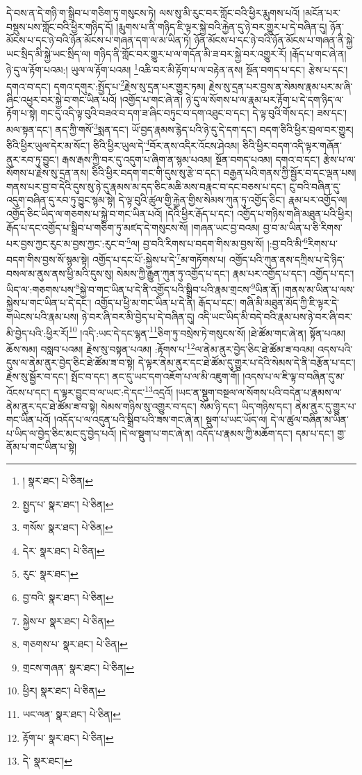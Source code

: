 དེ་བས་ན་དེ་གཉི་ག་སྒྲིབ་པ་གཅིག་ཏུ་གསུངས་ཏེ། ལས་སུ་མི་རུང་བར་གློང་བའི་ཕྱིར་རྨུགས་པའོ། །མངོན་པར་བསྡུས་པས་གློང་བའི་ཕྱིར་གཉིད་དོ། །རྨུགས་པ་ནི་གཉིད་ཇི་ལྟར་སྐྱེ་བའི་རྐྱེན་དུ་ཉེ་བར་གྱུར་པ་དེ་བཞིན་དུ། ཉོན་མོངས་པ་དང་ཉེ་བའི་ཉོན་མོངས་པ་གཞན་དག་ལ་མ་ཡིན་ཏེ། ཉོན་མོངས་པ་དང་ཉེ་བའི་ཉོན་མོངས་པ་གཞན་ནི་སྐྱེ་ཡང་སྲིད་མི་སྐྱེ་ཡང་སྲིད་ལ། གཉིད་ནི་གློང་བར་གྱུར་པ་ལ་གདོན་མི་ཟ་བར་སྐྱེ་བར་འགྱུར་རོ། །རྒོད་པ་གང་ཞེ་ན། ཉེ་དུ་ལ་རྟོག་པའམ:། ཡུལ་ལ་རྟོག་པའམ། \footnote{།    སྣར་ཐང་།  པེ་ཅིན། }འཆི་བར་མི་རྟོག་པ་ལ་བརྟེན་ནས། སྔོན་བགད་པ་དང་། རྩེས་པ་དང་། དགའ་བ་དང་། དགའ་དགུར་:སྤྱོད་པ་\footnote{སྤྱད་པ་  སྣར་ཐང་།  པེ་ཅིན། }རྗེས་སུ་དྲན་པར་གྱུར་ཏམ། རྗེས་སུ་དྲན་པར་བྱས་ན་སེམས་རྣམ་པར་མ་ཞི་ཞིང་འཕྱར་བར་སྐྱེ་བ་གང་ཡིན་པའོ། །འགྱོད་པ་གང་ཞེ་ན། ཉེ་དུ་ལ་སོགས་པ་ལ་རྣམ་པར་རྟོག་པ་དེ་དག་ཉིད་ལ་རྟོག་པ་སྟེ། གང་དུ་འདི་ལྟ་བུའི་བཟའ་བ་དག་ཟ་ཞིང་བཏུང་བ་དག་འཐུང་བ་དང་། དེ་ལྟ་བུའི་གོས་དང་། ཟས་དང་། མལ་སྟན་དང་། ནད་ཀྱི་གསོ་\footnote{གསོས་  སྣར་ཐང་།  པེ་ཅིན། }སྨན་དང་། ཡོ་བྱད་རྣམས་རྙེད་པའི་ཉེ་དུ་དེ་དག་དང་། བདག་ཅིའི་ཕྱིར་བྲལ་བར་གྱུར། ཅིའི་ཕྱིར་ཡུལ་དེར་མ་སོང་། ཅིའི་ཕྱིར་ཡུལ་དེ་\footnote{དེར་  སྣར་ཐང་།  པེ་ཅིན། }བོར་ནས་འདིར་འོངས་ཤེའམ། ཅིའི་ཕྱིར་བདག་འདི་ལྟར་གཞོན་ནུར་རབ་ཏུ་བྱུང་། རྒས་རྒས་ཀྱི་བར་དུ་འདུག་པ་ཞིག་ན་སྙམ་པའམ། སྔོན་བགད་པའམ། དགའ་བ་དང་། རྩེས་པ་ལ་སོགས་པ་རྗེས་སུ་དྲན་ནས། ཅིའི་ཕྱིར་བདག་གང་གི་དུས་སུ་རྩེ་བ་དང་། བརྒྱན་པའི་གནས་ཀྱི་སྦྱོར་བ་དང་ལྡན་པས། གནས་པར་བྱ་བ་དེའི་དུས་སུ་ཉེ་དུ་རྣམས་མ་དད་ཅིང་མཆི་མས་བརྣང་བ་དང་བཅས་པ་དང་། ངུ་བའི་བཞིན་དུ་འདུག་བཞིན་དུ་རབ་ཏུ་བྱུང་སྙམ་སྟེ། དེ་ལྟ་བུའི་ཚུལ་གྱི་རྐྱེན་གྱིས་སེམས་ཀུན་ཏུ་འགྱོད་ཅིང་། རྣམ་པར་འགྱོད་ལ། འགྱོད་ཅིང་ཡིད་ལ་གཅགས་པ་སྐྱེ་བ་གང་ཡིན་པའོ། །དེའི་ཕྱིར་རྒོད་པ་དང་། འགྱོད་པ་གཉིས་གཞི་མཐུན་པའི་ཕྱིར། རྒོད་པ་དང་འགྱོད་པ་སྒྲིབ་པ་གཅིག་ཏུ་མཛད་དེ་གསུངས་སོ། །གཞན་ཡང་བྱ་བའམ། བྱ་བ་མ་ཡིན་པ་ཅི་རིགས་པར་བྱས་ཀྱང་རུང་མ་བྱས་ཀྱང་:རུང་བ་\footnote{རུང་  སྣར་ཐང་། }ལ། བྱ་བའི་རིགས་པ་བདག་གིས་མ་བྱས་སོ། །:བྱ་བའི་མི་\footnote{བྱ་བའི་  སྣར་ཐང་།  པེ་ཅིན། }རིགས་པ་བདག་གིས་བྱས་སོ་སྙམ་སྟེ། འགྱོད་པ་དང་པོ་:སྐྱེས་པ་དེ་\footnote{སྐྱེས་པ་  སྣར་ཐང་།  པེ་ཅིན། }མ་གཏོགས་པ། འགྱོད་པའི་ཀུན་ནས་དཀྲིས་པ་དེ་ཉིད་བསལ་མ་ནུས་ནས་ཕྱི་མའི་དུས་སུ། སེམས་ཀྱི་རྒྱུན་ཀུན་ཏུ་འགྱོད་པ་དང་། རྣམ་པར་འགྱོད་པ་དང་། འགྱོད་པ་དང་། ཡིད་ལ་:གཅགས་པས་\footnote{གཅགས་པ་  སྣར་ཐང་།  པེ་ཅིན། }སྐྱེ་བ་གང་ཡིན་པ་དེ་ནི་འགྱོད་པའི་སྒྲིབ་པའི་རྣམ་གྲངས་\footnote{གྲངས་གཞན་  སྣར་ཐང་།  པེ་ཅིན། }ཡིན་ནོ། །གནས་མ་ཡིན་པ་ལས་སྐྱེས་པ་གང་ཡིན་པ་དེ་དང་། འགྱོད་པ་ཕྱི་མ་གང་ཡིན་པ་དེ་ནི། རྒོད་པ་དང་། གཞི་མི་མཐུན་མོད་ཀྱི་ཇི་ལྟར་དེ་གཡེངས་པའི་རྣམ་པས། ཉེ་བར་ཞི་བར་མི་བྱེད་པ་དེ་བཞིན་དུ། འདི་ཡང་ཡིད་མི་བདེ་བའི་རྣམ་པས་ཉེ་བར་ཞི་བར་མི་བྱེད་པའི་:ཕྱིར་རོ།\footnote{ཕྱིར།  སྣར་ཐང་།  པེ་ཅིན། } །འདི་:ཡང་དེ་དང་ལྷན་\footnote{ཡང་ལན་  སྣར་ཐང་།  པེ་ཅིན། }ཅིག་ཏུ་བསྲེས་ཏེ་གསུངས་སོ། །ཐེ་ཚོམ་གང་ཞེ་ན། སྟོན་པའམ། ཆོས་སམ། བསླབ་པའམ། རྗེས་སུ་བསྟན་པའམ། :རྟོགས་པ་\footnote{རྟོག་པ་  སྣར་ཐང་།  པེ་ཅིན། }ལ་ནེམ་ནུར་བྱེད་ཅིང་ཐེ་ཚོམ་ཟ་བའམ། འདས་པའི་དུས་ལ་ནེམ་ནུར་བྱེད་ཅིང་ཐེ་ཚོམ་ཟ་བ་སྟེ། དེ་ལྟར་ནེམ་ནུར་དང་ཐེ་ཚོམ་དུ་གྱུར་པ་དེའི་སེམས་དེ་ནི་བརྩོན་པ་དང་། རྗེས་སུ་སྦྱོར་བ་དང་། སྤོང་བ་དང་། ནང་དུ་ཡང་དག་འཇོག་པ་ལ་མི་འཇུག་གོ། །འདས་པ་ལ་ཇི་ལྟ་བ་བཞིན་དུ་མ་འོངས་པ་དང་། ད་ལྟར་བྱུང་བ་ལ་ཡང་:དེ་དང་\footnote{དེ་  སྣར་ཐང་། }འདྲའོ། །ཡང་ན་སྡུག་བསྔལ་ལ་སོགས་པའི་བདེན་པ་རྣམས་ལ་ནེམ་ནུར་དང་ཐེ་ཚོམ་ཟ་བ་སྟེ། སེམས་གཉིས་སུ་འགྱུར་བ་དང་། སོམ་ཉི་དང་། ཡིད་གཉིས་དང་། ནེམ་ནུར་དུ་གྱུར་པ་གང་ཡིན་པའོ། །འདོད་པ་ལ་འདུན་པའི་སྒྲིབ་པའི་ཟས་གང་ཞེ་ན། སྡུག་པ་ཡང་ཡོད་ལ། དེ་ལ་ཚུལ་བཞིན་མ་ཡིན་པ་ཡིད་ལ་བྱེད་ཅིང་མང་དུ་བྱེད་པའོ། །དེ་ལ་སྡུག་པ་གང་ཞེ་ན། འདོད་པ་རྣམས་ཀྱི་མཆོག་དང་། དམ་པ་དང་། གྱ་ནོམ་པ་གང་ཡིན་པ་སྟེ། 